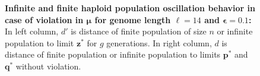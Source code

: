 \begin{figure}[h]
\begin{center}
\hspace{-3em}%
\vspace{-0.5em} \hspace{-3em}%


\caption[\textbf{Infinite and finite haploid population oscillation behavior in case of violation in $\bm{\mu}$ for genome length $\ell = 14$ and $\bm{\epsilon} = 0.1$}]{\textbf{Infinite and finite haploid population oscillation behavior in case of violation in $\bm{\mu}$ for genome length $\ell = 14$ and $\bm{\epsilon} = 0.1$:} 
  In left column, $d'$ is distance of finite population of size $n$ or infinite population to limit $\bm{z}^\ast$ for $g$ generations. In right column, $d$ is distance of finite population or infinite population to limits $\bm{p}^\ast$ and $\bm{q}^\ast$ without violation.}
\label{oscillation_14h_vio_mu_0.1}
\end{center}
\end{figure}

